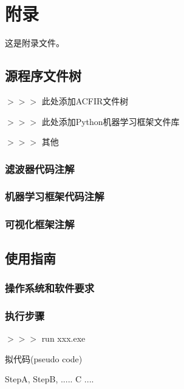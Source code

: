 \section*{附录}

{}

这是附录文件。

\subsection{源程序文件树}

$>>>$ 此处添加ACFIR文件树



$>>>$ 此处添加Python机器学习框架文件库



$>>>$ 其他

\subsubsection{滤波器代码注解}


\subsubsection{机器学习框架代码注解}


\subsubsection{可视化框架注解}


\subsection{使用指南}


\subsubsection{操作系统和软件要求}


\subsubsection{执行步骤}


$>>>$ run xxx.exe

拟代码(pseudo code)


StepA,  StepB,      .....   C ....